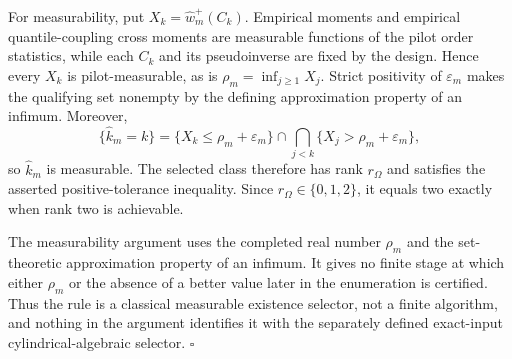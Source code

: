 For measurability, put \(X_k=\widehat w_m^+(C_k)\).  Empirical moments and empirical quantile-coupling cross moments are measurable functions of the pilot order statistics, while each \(C_k\) and its pseudoinverse are fixed by the design.  Hence every \(X_k\) is pilot-measurable, as is \(\rho_m=\inf_{j\ge1}X_j\).  Strict positivity of \(\varepsilon_m\) makes the qualifying set nonempty by the defining approximation property of an infimum.  Moreover,
\[
\{\widehat k_m=k\}
=\{X_k\le\rho_m+\varepsilon_m\}
\cap\bigcap_{j<k}\{X_j>\rho_m+\varepsilon_m\},
\tag{8}
\]
so \(\widehat k_m\) is measurable.  The selected class therefore has rank \(r_\Omega\) and satisfies the asserted positive-tolerance inequality.  Since \(r_\Omega\in\{0,1,2\}\), it equals two exactly when rank two is achievable.

The measurability argument uses the completed real number \(\rho_m\) and the set-theoretic approximation property of an infimum.  It gives no finite stage at which either \(\rho_m\) or the absence of a better value later in the enumeration is certified.  Thus the rule is a classical measurable existence selector, not a finite algorithm, and nothing in the argument identifies it with the separately defined exact-input cylindrical-algebraic selector. \(\square\)